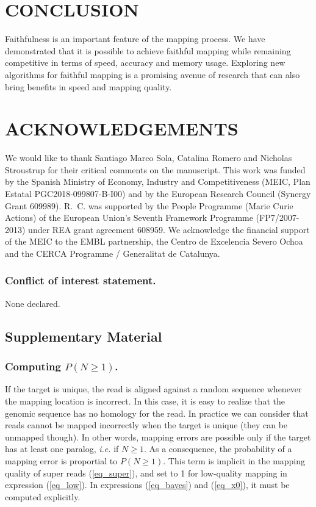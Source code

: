 \documentclass[a4,center,fleqn]{NAR}
\begin{document}
\section{CONCLUSION}

Faithfulness is an important feature of the mapping process. We have
demonstrated that it is possible to achieve faithful mapping while
remaining competitive in terms of speed, accuracy and memory usage.
Exploring new algorithms for faithful mapping is a promising avenue of
research that can also bring benefits in speed and mapping quality.


\section{ACKNOWLEDGEMENTS}

We would like to thank Santiago Marco Sola, Catalina Romero and Nicholas
Stroustrup for their critical comments on the manuscript.
This work was funded by the Spanish Ministry of Economy, Industry and
Competitiveness (MEIC, Plan Estatal PGC2018-099807-B-I00) and by the
European Research Council (Synergy Grant 609989). R.~C. was supported by
the People Programme (Marie Curie Actions) of the European Union's Seventh
Framework Programme (FP7/2007-2013) under REA grant agreement 608959. We
acknowledge the financial support of the MEIC to the EMBL partnership, the
Centro de Excelencia Severo Ochoa and the CERCA Programme / Generalitat de
Catalunya.




\subsubsection{Conflict of interest statement.} None declared.
\newpage




\clearpage

\subsection{Supplementary Material}
\subsubsection{Computing $P(N \geq 1)$.}
If the target is unique, the read is aligned against a random sequence
whenever the mapping location is incorrect. In this case, it is easy to
realize that the genomic sequence has no homology for the read. In
practice we can consider that reads cannot be mapped incorrectly when the
target is unique (they can be unmapped though). In other words, mapping
errors are possible only if the target has at least one paralog,
\textit{i.e.} if $N \geq 1$. As a consequence, the probability of a
mapping error is proportial to $P(N \geq 1)$. This term is implicit in the
mapping quality of super reads (\ref{eq_super}), and set to 1 for
low-quality mapping in expression (\ref{eq_low}). In expressions
(\ref{eq_bayes}) and (\ref{eq_x0}), it must be computed explicitly.
\end{document}
